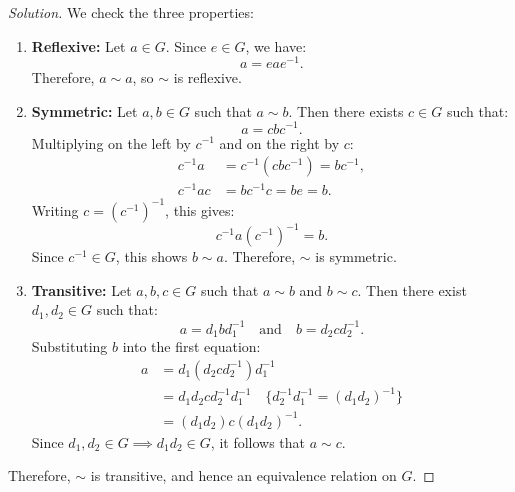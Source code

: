 \begin{proof}[Solution]
We check the three properties:
\begin{enumerate}[label=(\roman*)]
    \item \textbf{Reflexive:} Let $a \in G$. Since $e \in G$, we have:
    \[
    a = e a e^{-1}.
    \]
    Therefore, $a \sim a$, so $\sim$ is reflexive.
    
    \item \textbf{Symmetric:} Let $a, b \in G$ such that $a \sim b$. Then there exists $c \in G$ such that:
    \[
    a = c b c^{-1}.
    \]
    Multiplying on the left by $c^{-1}$ and on the right by $c$:
    \begin{align*}
    c^{-1} a &= c^{-1}(c b c^{-1}) = b c^{-1}, \\
    c^{-1} a c &= b c^{-1} c = b e = b.
    \end{align*}
    Writing $c = (c^{-1})^{-1}$, this gives:
    \[
    c^{-1} a (c^{-1})^{-1} = b.
    \]
    Since $c^{-1} \in G$, this shows $b \sim a$. Therefore, $\sim$ is symmetric.
    
    \item \textbf{Transitive:} Let $a, b, c \in G$ such that $a \sim b$ and $b \sim c$. Then there exist $d_1, d_2 \in G$ such that:
    \[
    a = d_1 b d_1^{-1} \quad \text{and} \quad b = d_2 c d_2^{-1}.
    \]
    Substituting $b$ into the first equation:
    \begin{align*}
    a &= d_1 (d_2 c d_2^{-1}) d_1^{-1} \\
    &= d_1 d_2 c d_2^{-1} d_1^{-1} \quad \{d_2^{-1} d_1^{-1} = (d_1 d_2)^{-1}\} \\
    &= (d_1 d_2) c (d_1 d_2)^{-1}.
    \end{align*}
    Since $d_1, d_2 \in G \implies d_1 d_2 \in G$, it follows that $a \sim c$.
\end{enumerate}
Therefore, $\sim$ is transitive, and hence an equivalence relation on $G$.
\end{proof}

